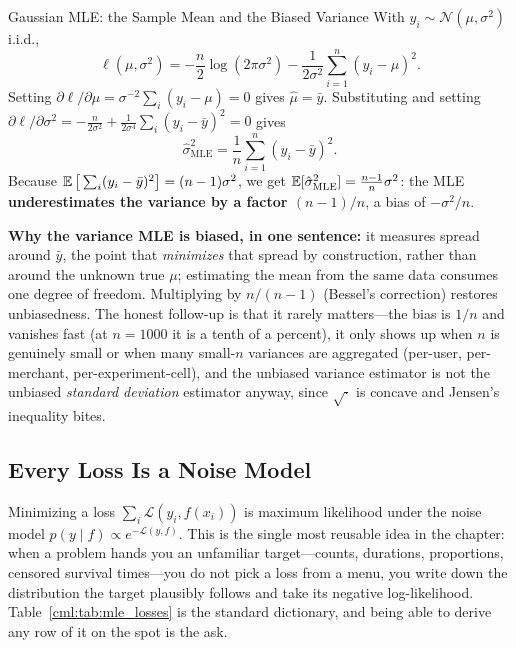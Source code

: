 \begin{mathresult}{Gaussian MLE: the Sample Mean and the Biased Variance}
With $y_i \sim \mathcal{N}(\mu, \sigma^2)$ i.i.d.,
\begin{equation}
\ell(\mu,\sigma^2) = -\frac{n}{2}\log(2\pi\sigma^2) - \frac{1}{2\sigma^2}\sum_{i=1}^n (y_i - \mu)^2 .
\end{equation}
Setting $\partial\ell/\partial\mu = \sigma^{-2}\sum_i (y_i - \mu) = 0$ gives $\hat\mu = \bar{y}$. Substituting and setting $\partial\ell/\partial\sigma^2 = -\tfrac{n}{2\sigma^2} + \tfrac{1}{2\sigma^4}\sum_i (y_i-\bar y)^2 = 0$ gives
\begin{equation}
\hat\sigma^2_{\text{MLE}} = \frac{1}{n}\sum_{i=1}^n (y_i - \bar y)^2 .
\end{equation}
Because $\operatorname{\mathbb{E}}\big[\sum_i (y_i - \bar y)^2\big] = (n-1)\sigma^2$, we get $\operatorname{\mathbb{E}}[\hat\sigma^2_{\text{MLE}}] = \frac{n-1}{n}\sigma^2$: the MLE \textbf{underestimates the variance by a factor $(n-1)/n$}, a bias of $-\sigma^2/n$.
\end{mathresult}

\textbf{Why the variance MLE is biased, in one sentence:} it measures spread around $\bar y$, the point that \textit{minimizes} that spread by construction, rather than around the unknown true $\mu$; estimating the mean from the same data consumes one degree of freedom. Multiplying by $n/(n-1)$ (Bessel's correction) restores unbiasedness. The honest follow-up is that it rarely matters---the bias is $1/n$ and vanishes fast (at $n=1000$ it is a tenth of a percent), it only shows up when $n$ is genuinely small or when many small-$n$ variances are aggregated (per-user, per-merchant, per-experiment-cell), and the unbiased variance estimator is not the unbiased \textit{standard deviation} estimator anyway, since $\sqrt{\cdot}$ is concave and Jensen's inequality bites.

\subsection{Every Loss Is a Noise Model}

\begin{keyinsight}
Minimizing a loss $\sum_i \mathcal{L}(y_i, f(x_i))$ is maximum likelihood under the noise model $p(y \mid f) \propto e^{-\mathcal{L}(y, f)}$. This is the single most reusable idea in the chapter: when a problem hands you an unfamiliar target---counts, durations, proportions, censored survival times---you do not pick a loss from a menu, you write down the distribution the target plausibly follows and take its negative log-likelihood. Table~\ref{cml:tab:mle_losses} is the standard dictionary, and being able to derive any row of it on the spot is the ask.
\end{keyinsight}

